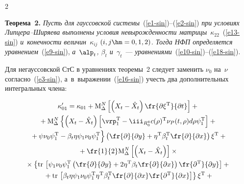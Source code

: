 \begin{multicols}{2}
\smallskip



\noindent

\textbf{Теорема~2.} \textit{Пусть для гауссовской системы}~(\ref{e1-sin})--(\ref{e2-sin}) \textit{при условиях Лип\-це\-ра--Ши\-ря\-ева выполнены условия невырожденности матрицы}~$\kappa_{22}$~(\ref{e13-sin}) \textit{и~конечности величин~$\kappa_{ij}$ $(i,j\hm=0,1,2)$. Тогда НФП определяется уравнением}~(\ref{e9-sin}), \textit{а~$\alp_t$, $\beta_t$ и~$\gamma_t$}~--- \textit{уравнениями}~(\ref{e10-sin})--(\ref{e18-sin}).



\smallskip



Для негауссовской СтС в уравнениях теоремы~2 следует заменить  $\nu_0$ на~$\nu$ согласно~(\ref{e3-sin}), а~в~выражении~(\ref{e16-sin}) учесть два дополнительных интегральных члена:

        \begin{multline*}

    \kappa_{01}'  =\kappa_{01} + \mathrm{M}^N_\Delta  \left[ \left(X_t - \hat X_t\right) \fr{\partial\xi^{\mathrm{T}}}{\partial t} \right] +{}\\

    {}+\mathrm{M}^N_\Delta  \left\{ \left(X_t -\hat X_t\right) \left[ \vrp_1^{\mathrm{T}} -\iii_{R_0^q} c(\rho)^{\mathrm{T}} \nu_P (t,\rho) d\rho \psi_1^{\mathrm{T}} \right] +{}\right.\\

\left.{}+ \psi \nu_0 \psi_1^{\mathrm{T}} - \beta_t \eta \psi_1 \nu_0\psi_1^{\mathrm{T}}

\vphantom{\iii_{R_0^q}}\right\} \left( \fr{\partial}{\partial y} + \eta^{\mathrm{T}} \beta_t^{\mathrm{T}} \fr{\partial}{\partial x}\right) \xi^{\mathrm{T}}+ {}\\

{}+\fr{1}{2} \mathrm{M}^N_\Delta  \left[ \left(X_t -\hat X_t\right)\right] \times{}\\

{}\times\left\{ \mathrm{tr}\, \left[ \psi_1 \nu_0 \psi_1^{\mathrm{T}} \left( \fr{\partial}{\partial y} + 2 \eta^{\mathrm{T}} \beta_t \fr{\partial}{\partial x} \right)\fr{\partial^{\mathrm{T}}}{\partial y} \right]+{}\right.\\

\left.{}+

   \mathrm{tr}\, \left[ \beta_t \eta \psi_1 \nu_0\psi_1^{\mathrm{T}} \eta^{\mathrm{T}} \beta_t^{\mathrm{T}} \fr{\partial}{\partial x} \fr{\partial^{\mathrm{T}}}{\partial x} \right] \right\} \xi^{\mathrm{T}} +{}\\


\end{multline*}
\end{multicols}
